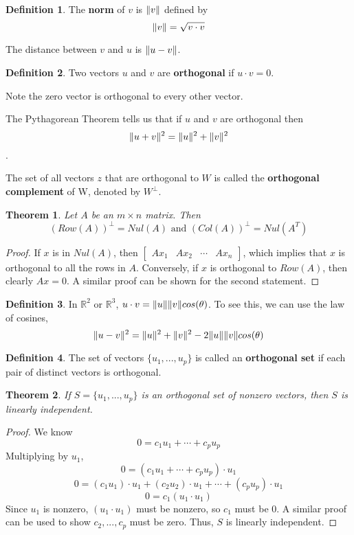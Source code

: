 \documentclass[letterpaper]{article}
\newtheorem{theorem}{Theorem}
\theoremstyle{definition}
\newtheorem{definition}{Definition}[section]
\DeclarePairedDelimiter{\norm}{\lVert}{\rVert}
\begin{document}
\begin{definition} 
The \textbf{norm} of $v$ is $\norm{v}$ defined by 
$$\norm{v} = \sqrt{v \cdot v}$$

The distance between $v$ and $u$ is $\norm{u - v}$. 
\end{definition}

\begin{definition}
Two vectors $u$ and $v$ are \textbf{orthogonal} if $u \cdot v = 0$. 

Note the zero vector is orthogonal to every other vector. 

The Pythagorean Theorem tells us that if $u$ and $v$ are orthogonal then $$\norm{u + v}^2 = \norm{u}^2 + \norm{v}^2$$.

The set of all vectors $z$ that are orthogonal to $W$ is called the \textbf{orthogonal complement} of W, denoted by $W^{\perp}$.  
\end{definition}

\begin{theorem}
Let $A$ be an $m \times n$ matrix. Then 
$$(Row(A))^{\perp} = Nul(A) \text{ and } (Col(A))^{\perp} = Nul(A^T)$$
\end{theorem}
\begin{proof}
If $x$ is in $Nul(A)$, then $\begin{bmatrix}
Ax_1 & Ax_2 & \cdots & Ax_n
\end{bmatrix}$, which implies that $x$ is orthogonal to all the rows in $A$. Conversely, if $x$ is orthogonal to $Row(A)$, then clearly $Ax = 0$. A similar proof can be shown for the second statement. 
\end{proof}

\begin{definition}
In $\mathbb{R}^2$ or $\mathbb{R}^3$, $u \cdot v = \norm{u} \norm{v} cos(\theta)$. To see this, we can use the law of cosines, 
$$\norm{u - v}^2 = \norm{u}^2 + \norm{v}^2 - 2 \norm{u} \norm{v} cos(\theta)$$
\end{definition}

\begin{definition}
The set of vectors $\{ u_1 , ... , u_p \}$ is called an \textbf{orthogonal set} if each pair of distinct vectors is orthogonal. 
\end{definition}

\begin{theorem}
If $S = \{ u_1 , ... , u_p \}$ is an orthogonal set of nonzero vectors, then $S$ is linearly independent. 
\end{theorem}
\begin{proof}
We know $$ 0 = c_1 u_1 + \cdots + c_p u_p $$
Multiplying by $u_1$, 
$$0 = (c_1 u_1 + \cdots + c_p u_p) \cdot u_1$$
$$0 = (c_1 u_1) \cdot u_1 + (c_2 u_2) \cdot u_1 + \cdots + (c_p u_p ) \cdot u_1 $$
$$0 = c_1 (u_1 \cdot u_1) $$
Since $u_1$ is nonzero, $(u_1 \cdot u_1)$ must be nonzero, so $c_1$ must be 0. A similar proof can be used to show $c_2, ..., c_p$ must be zero. Thus, $S$ is linearly independent. 
\end{proof}
\end{document}
